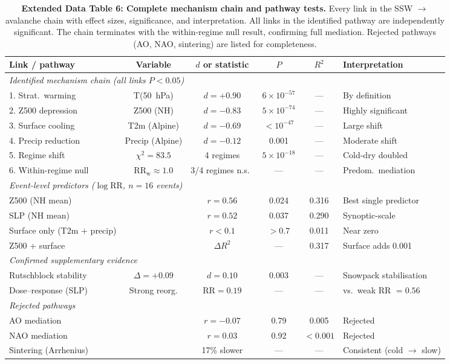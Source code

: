 \documentclass[11pt,letterpaper]{article}
\begin{document}
\begin{table}[!ht]
\centering
\caption{\textbf{Extended Data Table 6: Complete mechanism chain and pathway tests.}
Every link in the SSW $\to$ avalanche chain with effect sizes, significance, and interpretation. All links in the identified pathway are independently significant. The chain terminates with the within-regime null result, confirming full mediation. Rejected pathways (AO, NAO, sintering) are listed for completeness.}
\label{tab:mechanism}
\small
\begin{tabular}{lccccl}
\toprule
Link / pathway & Variable & $d$ or statistic & $P$ & $R^2$ & Interpretation \\
\midrule
\multicolumn{6}{l}{\textit{Identified mechanism chain (all links $P < 0.05$)}} \\
1. Strat.\ warming & T(50~hPa) & $d = +0.90$ & $6 \times 10^{-57}$ & --- & By definition \\
2. Z500 depression & Z500 (NH) & $d = -0.83$ & $5 \times 10^{-74}$ & --- & Highly significant \\
3. Surface cooling & T2m (Alpine) & $d = -0.69$ & $< 10^{-47}$ & --- & Large shift \\
4. Precip reduction & Precip (Alpine) & $d = -0.12$ & 0.001 & --- & Moderate shift \\
5. Regime shift & $\chi^2 = 83.5$ & 4 regimes & $5 \times 10^{-18}$ & --- & Cold-dry doubled \\
6. Within-regime null & $\mathrm{RR}_\mathrm{w} \approx 1.0$ & 3/4 regimes n.s.\ & --- & --- & Predom.\ mediation \\
\midrule
\multicolumn{6}{l}{\textit{Event-level predictors ($\log\mathrm{RR}$, $n = 16$ events)}} \\
Z500 (NH mean) & & $r = 0.56$ & 0.024 & 0.316 & Best single predictor \\
SLP (NH mean) & & $r = 0.52$ & 0.037 & 0.290 & Synoptic-scale \\
Surface only (T2m + precip) & & $r < 0.1$ & $> 0.7$ & 0.011 & Near zero \\
Z500 + surface & & $\Delta R^2$ & --- & 0.317 & Surface adds 0.001 \\
\midrule
\multicolumn{6}{l}{\textit{Confirmed supplementary evidence}} \\
Rutschblock stability & $\Delta = +0.09$ & $d = 0.10$ & 0.003 & --- & Snowpack stabilisation \\
Dose--response (SLP) & Strong reorg. & $\mathrm{RR} = 0.19$ & --- & --- & vs.\ weak RR $= 0.56$ \\
\midrule
\multicolumn{6}{l}{\textit{Rejected pathways}} \\
AO mediation & & $r = -0.07$ & 0.79 & 0.005 & Rejected \\
NAO mediation & & $r = 0.03$ & 0.92 & $< 0.001$ & Rejected \\
Sintering (Arrhenius) & & 17\% slower & --- & --- & Consistent (cold $\to$ slow) \\
\bottomrule
\end{tabular}
\end{table}
\end{document}
